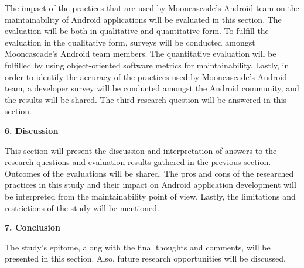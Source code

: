 The impact of the practices that are used by Mooncascade's Android team on the maintainability of Android applications will be evaluated in this section. The evaluation will be both in qualitative and quantitative form. To fulfill the evaluation in the qualitative form, surveys will be conducted amongst Mooncascade's Android team members. The quantitative evaluation will be fulfilled by using object-oriented software metrics for maintainability. Lastly, in order to identify the accuracy of the practices used by Mooncascade's Android team, a developer survey will be conducted amongst the Android community, and the results will be shared. The third research question will be answered in this section.

\noindent\textbf{6. Discussion}

This section will present the discussion and interpretation of answers to the research questions and evaluation results gathered in the previous section. Outcomes of the evaluations will be shared. The pros and cons of the researched practices in this study and their impact on Android application development will be interpreted from the maintainability point of view. Lastly, the limitations and restrictions of the study will be mentioned.

\noindent\textbf{7. Conclusion}

The study's epitome, along with the final thoughts and comments, will be presented in this section. Also, future research opportunities will be discussed.

